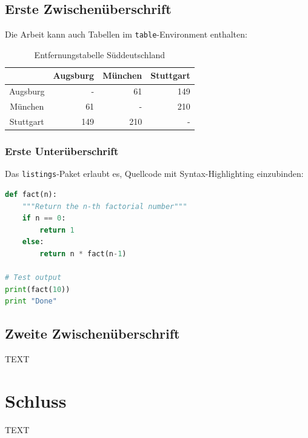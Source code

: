 \subsection{Erste Zwischenüberschrift}
\label{sec:ErsteZwischenueberschrift}
Die Arbeit kann auch Tabellen im \texttt{table}-Environment enthalten:
\begin{table}[ht]
  \centering
  \caption{Entfernungstabelle Süddeutschland}
  \begin{tabular}{c r r r}
    \toprule
              & Augsburg & München & Stuttgart \\
    \midrule
    Augsburg  & -        & 61      & 149       \\
    München   & 61       & -       & 210       \\
    Stuttgart & 149      & 210     & -         \\
    \bottomrule
  \end{tabular}
  \label{tab:entfernungen}
\end{table}

\subsubsection{Erste Unterüberschrift}
\label{sec:ErsteUnterueberschrift}

Das \texttt{listings}-Paket erlaubt es, Quellcode mit Syntax-Highlighting einzubinden:

\begin{center}
  \begin{minipage}{.75\textwidth}
\begin{lstlisting}[language=Python]
def fact(n):
    """Return the n-th factorial number"""
    if n == 0:
        return 1
    else:
        return n * fact(n-1)
  
# Test output
print(fact(10))
print "Done"
\end{lstlisting}
  \end{minipage}
\end{center}

\subsection{Zweite Zwischenüberschrift}
\label{sec:ZweiteZwischenueberschrift}

TEXT

\section{Schluss}
\label{sec:Schluss}

TEXT

\printbibheading


\printbibliography[nottype=online,heading=subbibliography,title={\regularlit}]
\printbibliography[type=online,heading=subbibliography,title={\onlinelit}]





